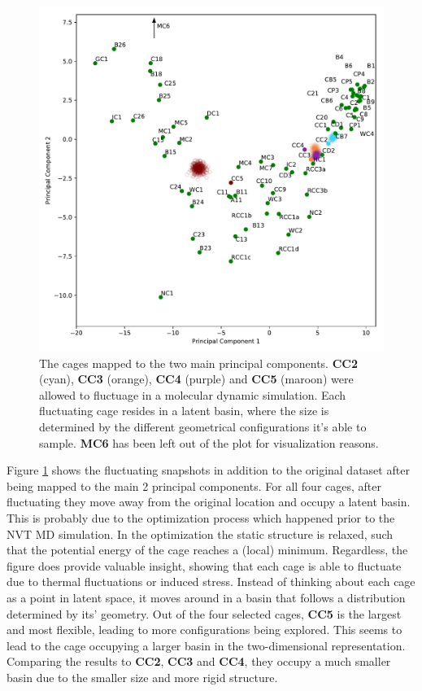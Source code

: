 \documentclass[journal=jacsat,manuscript=article]{achemso}
\begin{document}
{\begin{figure}
\centering
	\includegraphics[width=\columnwidth]{../PCA_latent_cage_space_with_flexible_cages_2D.pdf}
	\caption{\color{red}The cages mapped to the two main principal components. \textbf{CC2} (cyan), \textbf{CC3} (orange), \textbf{CC4} (purple) and \textbf{CC5} (maroon) were allowed to fluctuage in a molecular dynamic simulation. Each fluctuating cage resides in a latent basin, where the size is determined by the different geometrical configurations it's able to sample. \textbf{MC6} has been left out of the plot for visualization reasons.
	} \label{fig:pca_space_with_flex}
\end{figure}

Figure \ref{fig:pca_space_with_flex} shows the fluctuating snapshots in addition to the original dataset after being mapped to the main 2 principal components. For all four cages, after fluctuating they move away from the original location and occupy a latent basin. This is probably due to the optimization process which happened prior to the NVT MD simulation. In the optimization the static structure is relaxed, such that the potential energy of the cage reaches a (local) minimum. Regardless, the figure does provide valuable insight, showing that each cage is able to fluctuate due to thermal fluctuations or induced stress. Instead of thinking about each cage as a point in latent space, it moves around in a basin that follows a distribution determined by its' geometry. Out of the four selected cages, \textbf{CC5} is the largest and most flexible, leading to more configurations being explored. This seems to lead to the cage occupying a larger basin in the two-dimensional representation. Comparing the results to \textbf{CC2}, \textbf{CC3} and \textbf{CC4}, they occupy a much smaller basin due to the smaller size and more rigid structure.}
\end{document}
